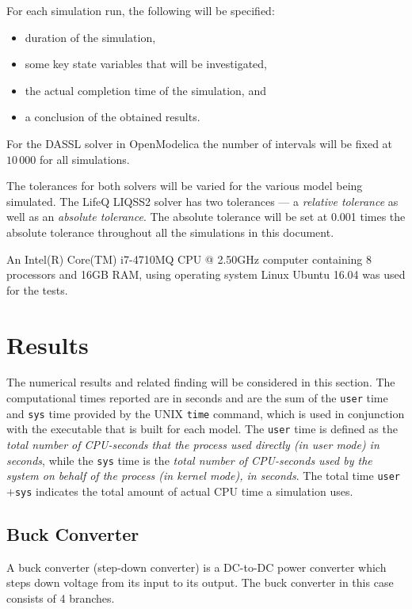 \documentclass[10pt]{article}
\begin{document}
For each simulation run, the following will be specified:
\begin{itemize}
 \item duration of the simulation,
 \item some key state variables that will be investigated,
 \item the actual completion time of the simulation, and
 \item a conclusion of the obtained results.
\end{itemize}

For the DASSL solver in OpenModelica the number of intervals will be fixed at $10\,000$ for all simulations.

The tolerances for both solvers will be varied for the various model being simulated. The LifeQ LIQSS2 solver has two tolerances --- a {\em relative tolerance} as well as an {\em absolute tolerance}. The absolute tolerance will be set at 0.001 times the absolute tolerance throughout all the simulations in this document.

An Intel(R) Core(TM) i7-4710MQ CPU @ 2.50GHz computer containing 8 processors and 16GB RAM,
using operating system Linux Ubuntu 16.04 was used for the tests.



\section{Results}

The numerical results and related finding will be considered in this section. The computational times reported are in seconds and are the sum of the {\tt{user}} time and {\tt{sys}} time provided by the UNIX {\tt{time}} command, which is used in conjunction with the executable that is built for each model. The {\tt{user}} time is defined as the {\em total number of CPU-seconds that the process used directly (in user mode) in seconds}, while the {\tt{sys}} time is the {\em total number of CPU-seconds used by the system on behalf of the process (in kernel mode), in seconds}. The total time {\tt{user}}$+${\tt{sys}} indicates the total amount of actual CPU time a simulation uses.

\newpage

\subsection{Buck Converter}

A buck converter (step-down converter) is a DC-to-DC power converter which steps down voltage from its input to its output. The buck converter in this case consists of 4 branches.
\end{document}
